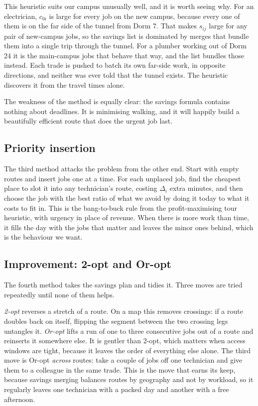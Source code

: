 \documentclass[11pt]{article}
\begin{document}
This heuristic suits our campus unusually well, and it is worth seeing why.
For an electrician, $c_{0i}$ is large for every job on the new campus,
because every one of them is on the far side of the tunnel from Dorm 7. That
makes $s_{ij}$ large for any pair of new-campus jobs, so the savings list is
dominated by merges that bundle them into a single trip through the tunnel.
For a plumber working out of Dorm 24 it is the main-campus jobs that behave
that way, and the list bundles those instead. Each trade is pushed to batch
its own far-side work, in opposite directions, and neither was ever told that
the tunnel exists. The heuristic discovers it from the travel times alone.

The weakness of the method is equally clear: the savings formula contains
nothing about deadlines. It is minimising walking, and it will happily build a
beautifully efficient route that does the urgent job last.

\subsection{Priority insertion}

The third method attacks the problem from the other end. Start with empty
routes and insert jobs one at a time. For each unplaced job, find the cheapest
place to slot it into any technician's route, costing $\Delta_i$ extra minutes,
and then choose the job with the best ratio of what we avoid by doing it today
to what it costs to fit in. This is the bang-to-buck rule from the
profit-maximising tour heuristic, with urgency in place of revenue. When there
is more work than time, it fills the day with the jobs that matter and leaves
the minor ones behind, which is the behaviour we want.

\subsection{Improvement: 2-opt and Or-opt}

The fourth method takes the savings plan and tidies it. Three moves are tried
repeatedly until none of them helps.

\emph{2-opt} reverses a stretch of a route. On a map this removes crossings:
if a route doubles back on itself, flipping the segment between the two
crossing legs untangles it. \emph{Or-opt} lifts a run of one to three
consecutive jobs out of a route and reinserts it somewhere else. It is gentler
than 2-opt, which matters when access windows are tight, because it leaves the
order of everything else alone. The third move is Or-opt \emph{across} routes:
take a couple of jobs off one technician and give them to a colleague in the
same trade. This is the move that earns its keep, because savings merging
balances routes by geography and not by workload, so it regularly leaves one
technician with a packed day and another with a free afternoon.
\end{document}
